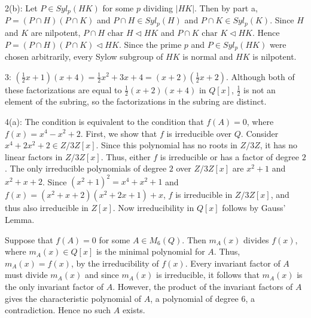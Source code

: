 \documentclass[12pt]{article}
\begin{document}
2(b): Let $P \in Syl_p(HK)$ for some $p$ dividing $|HK|$. Then by part a, $P=(P\cap H)(P\cap K)$ and $P\cap H\in Syl_p(H)$ and $P\cap K\in Syl_p(K)$. Since $H$ and $K$ are nilpotent, $P\cap H \text{ char }H\lhd HK$ and $P\cap K\text{ char } K\lhd HK$. Hence $P=(P\cap H)(P\cap K)\lhd HK$. Since the prime $p$ and $P\in Syl_p(HK)$ were chosen arbitrarily, every Sylow subgroup of $HK$ is normal and $HK$ is nilpotent. \newline

3: $(\frac{1}{2}x+1)(x+4)=\frac{1}{2}x^2+3x+4=(x+2)(\frac{1}{2}x+2)$. Although both of these factorizations are equal to $\frac{1}{2}(x+2)(x+4)$ in $Q[x]$, $\frac{1}{2}$ is not an element of the subring, so the factorizations in the subring are distinct. \newline

4(a): The condition is equivalent to the condition that $f(A)=0$, where $f(x)=x^4-x^2+2$. First, we show that $f$ is irreducible over $Q$. Consider $x^4+2x^2+2 \in Z/3Z[x]$. Since this polynomial has no roots in $Z/3Z$, it has no linear factors in $Z/3Z[x]$. Thus, either $f$ is irreducible or has a factor of degree $2$. The only irreducible polynomials of degree $2$ over $Z/3Z[x]$ are $x^2+1$ and $x^2+x+2$. Since $(x^2+1)^2=x^4+x^2+1$ and $f(x)=(x^2+x+2)(x^2+2x+1)+x$, $f$ is irreducible in $Z/3Z[x]$, and thus also irreducible in $Z[x]$. Now irreducibility in $Q[x]$ follows by Gauss' Lemma. \newline

Suppose that $f(A)=0$ for some $A\in M_6(Q)$. Then $m_A(x)$ divides $f(x)$, where $m_A(x)\in Q[x]$ is the minimal polynomial for $A$. Thus, $m_A(x)=f(x)$, by the irreducibility of $f(x)$. Every invariant factor of $A$ must divide $m_A(x)$ and since $m_A(x)$ is irreducible, it follows that $m_A(x)$ is the only invariant factor of $A$. However, the product of the invariant factors of $A$ gives the characteristic polynomial of $A$, a polynomial of degree $6$, a contradiction. Hence no such $A$ exists. \newline
\end{document}
